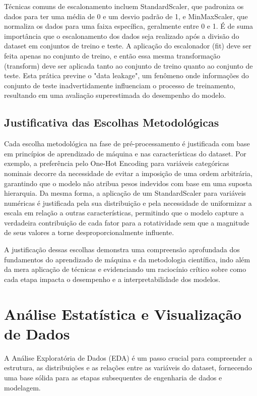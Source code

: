 \documentclass[sigconf]{acmart}
\begin{document}
Técnicas comuns de escalonamento incluem StandardScaler, que padroniza os dados para ter uma média de 0 e um desvio padrão de 1, e MinMaxScaler, que normaliza os dados para uma faixa específica, geralmente entre 0 e 1. É de suma importância que o escalonamento dos dados seja realizado após a divisão do dataset em conjuntos de treino e teste. A aplicação do escalonador (fit) deve ser feita apenas no conjunto de treino, e então essa mesma transformação (transform) deve ser aplicada tanto ao conjunto de treino quanto ao conjunto de teste. Esta prática previne o "data leakage", um fenômeno onde informações do conjunto de teste inadvertidamente influenciam o processo de treinamento, resultando em uma avaliação superestimada do desempenho do modelo.

\subsection{Justificativa das Escolhas Metodológicas}
Cada escolha metodológica na fase de pré-processamento é justificada com base em princípios de aprendizado de máquina e nas características do dataset. Por exemplo, a preferência pelo One-Hot Encoding para variáveis categóricas nominais decorre da necessidade de evitar a imposição de uma ordem arbitrária, garantindo que o modelo não atribua pesos indevidos com base em uma suposta hierarquia. Da mesma forma, a aplicação de um StandardScaler para variáveis numéricas é justificada pela sua distribuição e pela necessidade de uniformizar a escala em relação a outras características, permitindo que o modelo capture a verdadeira contribuição de cada fator para a rotatividade sem que a magnitude de seus valores a torne desproporcionalmente influente.

A justificação dessas escolhas demonstra uma compreensão aprofundada dos fundamentos do aprendizado de máquina e da metodologia científica, indo além da mera aplicação de técnicas e evidenciando um raciocínio crítico sobre como cada etapa impacta o desempenho e a interpretabilidade dos modelos.

\section{Análise Estatística e Visualização de Dados}
A Análise Exploratória de Dados (EDA) é um passo crucial para compreender a estrutura, as distribuições e as relações entre as variáveis do dataset, fornecendo uma base sólida para as etapas subsequentes de engenharia de dados e modelagem.
\end{document}
